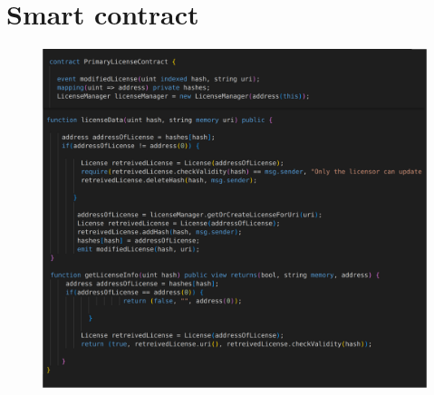
\chapter{Smart contract}
\begin{center}
	\begin{figure}[htb!]
		
		\begin{minipage}{0.43\linewidth}
			\centering
			\includegraphics[width=1.95\textwidth]{images/chap03_sc_primary.png}
		\end{minipage}
		
	\end{figure}
	
\end{center}